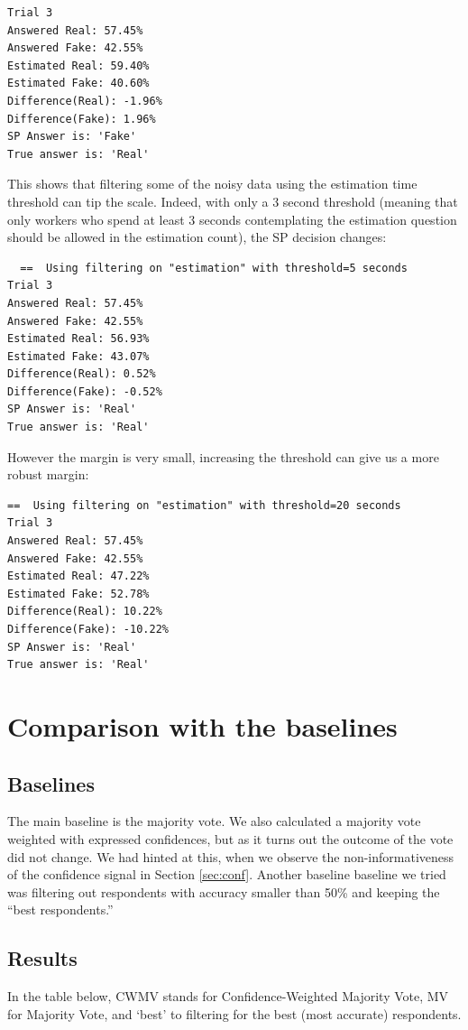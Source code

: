 \documentclass{report}
\theoremstyle{definition}
\begin{document}
\begin{verbatim}
Trial 3
Answered Real: 57.45%
Answered Fake: 42.55%
Estimated Real: 59.40%
Estimated Fake: 40.60%
Difference(Real): -1.96%
Difference(Fake): 1.96%
SP Answer is: 'Fake'
True answer is: 'Real'
\end{verbatim}

This shows that filtering some of the noisy data using the estimation time threshold can tip the scale. Indeed, with only a 3 second threshold (meaning that only workers who spend at least 3 seconds contemplating the estimation question should be allowed in the estimation count), the SP decision changes:

\begin{verbatim}
  ==  Using filtering on "estimation" with threshold=5 seconds
Trial 3
Answered Real: 57.45%
Answered Fake: 42.55%
Estimated Real: 56.93%
Estimated Fake: 43.07%
Difference(Real): 0.52%
Difference(Fake): -0.52%
SP Answer is: 'Real'
True answer is: 'Real'  
\end{verbatim}

However the margin is very small, increasing the threshold can give us a more robust margin:

\begin{verbatim}
==  Using filtering on "estimation" with threshold=20 seconds
Trial 3
Answered Real: 57.45%
Answered Fake: 42.55%
Estimated Real: 47.22%
Estimated Fake: 52.78%
Difference(Real): 10.22%
Difference(Fake): -10.22%
SP Answer is: 'Real'
True answer is: 'Real'
\end{verbatim}


\section{Comparison with the baselines}
\label{sec:baseline_comparison}
\subsection{Baselines}
The main baseline is the majority vote. We also calculated a majority vote weighted with expressed confidences, but as it turns out the outcome of the vote did not change. We had hinted at this, when we observe the non-informativeness of the confidence signal in Section \ref{sec:conf}. Another baseline baseline we tried was filtering out respondents with accuracy smaller than 50\% and keeping the ``best respondents.''

\subsection{Results}
In the table below, CWMV stands for Confidence-Weighted Majority Vote, MV for Majority Vote, and `best' to filtering for the best (most accurate) respondents.
\end{document}
